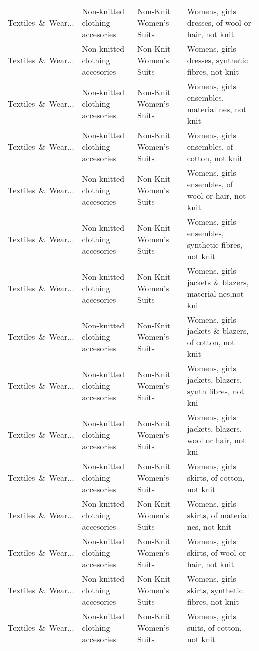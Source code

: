 \begin{appendices}
\begin{xltabular}{\textwidth}{|p{0.10\textwidth}|p{0.25\textwidth}|p{0.24\textwidth}|p{0.31\textwidth}|}
Textiles\ \&\ Wear... & Non-knitted clothing accesories & Non-Knit Women's Suits & Womens, girls dresses, of wool or hair, not knit \\
Textiles\ \&\ Wear... & Non-knitted clothing accesories & Non-Knit Women's Suits & Womens, girls dresses, synthetic fibres, not knit \\
Textiles\ \&\ Wear... & Non-knitted clothing accesories & Non-Knit Women's Suits & Womens, girls ensembles, material nes, not knit \\
Textiles\ \&\ Wear... & Non-knitted clothing accesories & Non-Knit Women's Suits & Womens, girls ensembles, of cotton, not knit \\
Textiles\ \&\ Wear... & Non-knitted clothing accesories & Non-Knit Women's Suits & Womens, girls ensembles, of wool or hair, not knit \\
Textiles\ \&\ Wear... & Non-knitted clothing accesories & Non-Knit Women's Suits & Womens, girls ensembles, synthetic fibres, not knit \\
Textiles\ \&\ Wear... & Non-knitted clothing accesories & Non-Knit Women's Suits & Womens, girls jackets \& blazers, material nes,not kni \\
Textiles\ \&\ Wear... & Non-knitted clothing accesories & Non-Knit Women's Suits & Womens, girls jackets \& blazers, of cotton, not knit \\
Textiles\ \&\ Wear... & Non-knitted clothing accesories & Non-Knit Women's Suits & Womens, girls jackets, blazers, synth fibres, not kni \\
Textiles\ \&\ Wear... & Non-knitted clothing accesories & Non-Knit Women's Suits & Womens, girls jackets, blazers, wool or hair, not kni \\
Textiles\ \&\ Wear... & Non-knitted clothing accesories & Non-Knit Women's Suits & Womens, girls skirts, of cotton, not knit \\
Textiles\ \&\ Wear... & Non-knitted clothing accesories & Non-Knit Women's Suits & Womens, girls skirts, of material nes, not knit \\
Textiles\ \&\ Wear... & Non-knitted clothing accesories & Non-Knit Women's Suits & Womens, girls skirts, of wool or hair, not knit \\
Textiles\ \&\ Wear... & Non-knitted clothing accesories & Non-Knit Women's Suits & Womens, girls skirts, synthetic fibres, not knit \\
Textiles\ \&\ Wear... & Non-knitted clothing accesories & Non-Knit Women's Suits & Womens, girls suits, of cotton, not knit \\

\end{xltabular}
\end{appendices}
